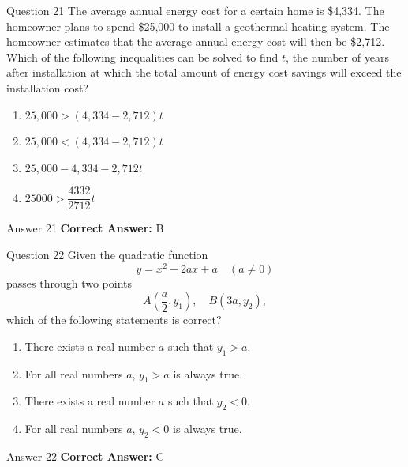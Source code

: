 \documentclass{beamer}
\begin{document}
\begin{frame}{Question 21}
\small
The average annual energy cost for a certain home is \$4{,}334. The homeowner plans to spend \$25{,}000 to install a geothermal heating system. The homeowner estimates that the average annual energy cost will then be \$2{,}712. Which of the following inequalities can be solved to find \(t\), the number of years after installation at which the total amount of energy cost savings will exceed the installation cost?
\vspace{0.35cm}
\begin{enumerate}
    \item[A.] \(25{,}000 > (4{,}334 - 2{,}712)t\)
    \item[B.] \(25{,}000 < (4{,}334 - 2{,}712)t\)
    \item[C.] \(25{,}000 - 4{,}334 - 2{,}712t\)
    \item[D.] \(25000 > \dfrac{4332}{2712}t\)
\end{enumerate}
\end{frame}
\begin{frame}{Answer 21}
\small
\textbf{Correct Answer:} B
\end{frame}

\begin{frame}{Question 22}
\small
Given the quadratic function  
\[
y = x^2 - 2ax + a \quad (a \ne 0)
\]  
passes through two points  
\[
A\left( \frac{a}{2}, y_1 \right), \quad B(3a, y_2),
\]  
which of the following statements is correct?
\vspace{0.35cm}
\begin{enumerate}
    \item[A.] There exists a real number \(a\) such that \(y_1 > a\).
    \item[B.] For all real numbers \(a\), \(y_1 > a\) is always true.
    \item[C.] There exists a real number \(a\) such that \(y_2 < 0\).
    \item[D.] For all real numbers \(a\), \(y_2 < 0\) is always true.
\end{enumerate}
\end{frame}
\begin{frame}{Answer 22}
\small
\textbf{Correct Answer:} C
\end{frame}
\end{document}
